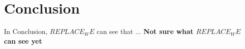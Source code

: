 \chapter{Conclusion}
\label{sec:conclusion}

In Conclusion, $REPLACE_WE$ can see that ... \textbf{Not sure what $REPLACE_WE$ can see yet}


